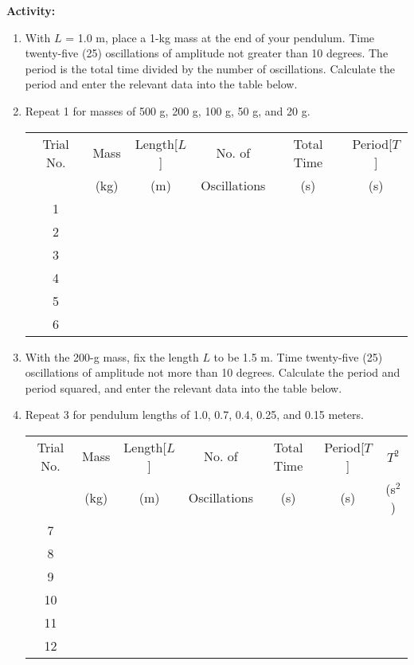 {\noindent \bf Activity:} \begin{enumerate}

\item With $L$ = 1.0 m, place a 1-kg mass at the end of your pendulum. Time twenty-five (25) oscillations of amplitude not greater than 10 degrees. The period is the total time divided by the number of oscillations. Calculate the period and enter the relevant data into the table below.

\item Repeat 1 for masses of 500 g, 200 g, 100 g, 50 g, and 20 g.

\begin{center} \begin{tabular}{|c|c|c|c|c|c|} \hline Trial No. & Mass & Length[$L$] & No. of & Total Time & Period[$T$] \\ & (kg) & (m) & Oscillations & (s) & (s) \\ \hline \hline 1 & & & & & \\ \hline 2 & & & & & \\ \hline 3 & & & & & \\ \hline 4 & & & & & \\ \hline 5 & & & & & \\ \hline 6 & & & & & \\ \hline \end{tabular} \end{center}

\item With the 200-g mass, fix the length $L$ to be 1.5 m. Time twenty-five (25) oscillations of amplitude not more than 10 degrees. Calculate the period and period squared, and enter the relevant data into the table below.

\item Repeat 3 for pendulum lengths of 1.0, 0.7, 0.4, 0.25, and 0.15 meters.

\begin{center} \begin{tabular}{|c|c|c|c|c|c|c|} \hline Trial No. & Mass & Length[$L$] & No. of & Total Time & Period[$T$] & $T^2$ \\ & (kg) & (m) & Oscillations & (s) & (s) & (s$^2$) \\ \hline \hline 7 & & & & & & \\ \hline 8 & & & & & & \\ \hline 9 & & & & & & \\ \hline 10 & & & & & & \\ \hline 11 & & & & & & \\ \hline 12 & & & & & & \\ \hline \end{tabular} \end{center}


\end{enumerate}
